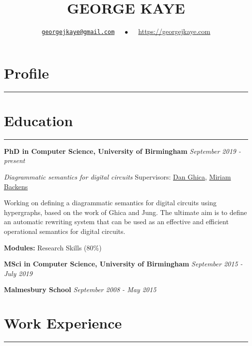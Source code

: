 \documentclass[10pt]{article}
\title{\vspace{-0.75in}\Huge\textbf{GEORGE KAYE}}
\author{\href{mailto:georgejkaye@gmail.com}{\texttt{georgejkaye@gmail.com}} $\quad\bullet\quad$ \url{https://georgejkaye.com}}
\date{}
\newcommand{\stroke}{\hrule\vspace{1em}}
\newenvironment{education}[3]
    {\noindent\large{\textbf{#1} \hfill \textit{#2 - #3}}
    \vspace{0.5em}
    }
    {\vspace{1em}}
\begin{document}
\maketitle

\section*{Profile}
\stroke

\section*{Education}
\stroke

\begin{education}{PhD in Computer Science, University of Birmingham}{September 2019}{present}

    \noindent\large\textit{Diagrammatic semantics for digital circuits} \hfill Supervisors: \href{https://www.cs.bham.ac.uk/~drg/}{Dan Ghica}, \href{https://www.cs.bham.ac.uk/~backensm/}{Miriam Backens}

    \vspace{0.5em}

    \noindent Working on defining a diagrammatic semantics for digital circuits using hypergraphs, based on the work of Ghica and Jung. The ultimate aim is to define an automatic rewriting system that can be used as an effective and efficient operational semantics for digital circuits.

    \vspace{0.5em}

    \noindent\textbf{Modules:} Research Skills (80\%)
\end{education}

\begin{education}{MSci in Computer Science, University of Birmingham}{September 2015}{July 2019}

\end{education}

\begin{education}{Malmesbury School}{September 2008}{May 2015}
\end{education}

\vspace{1em}

\section*{Work Experience}
\stroke
\end{document}
